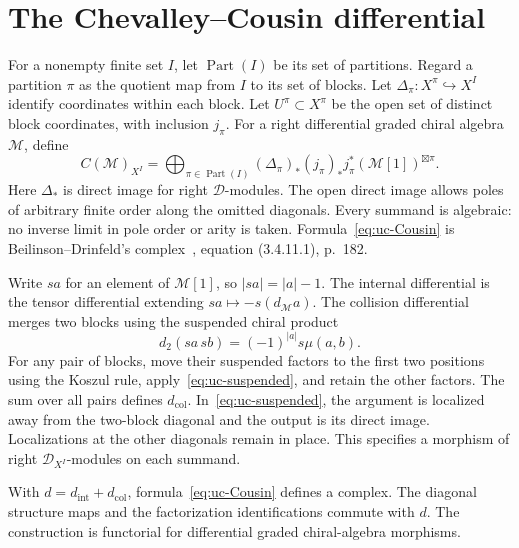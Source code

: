 \section{The Chevalley--Cousin differential}

For a nonempty finite set $I$, let $\operatorname{Part}(I)$ be its set of partitions.
Regard a partition $\pi$ as the quotient map from $I$ to its set of blocks.
Let $\Delta_\pi:X^\pi\hookrightarrow X^I$ identify coordinates within each block.
Let $U^\pi\subset X^\pi$ be the open set of distinct block coordinates, with inclusion $j_\pi$.
For a right differential graded chiral algebra $\mathcal M$, define
\begin{equation}\label{eq:uc-Cousin}
 C(\mathcal M)_{X^I}
 =\bigoplus_{\pi\in\operatorname{Part}(I)}
 (\Delta_\pi)_*(j_\pi)_*j_\pi^*
 (\mathcal M[1])^{\boxtimes\pi}.
\end{equation}
Here $\Delta_*$ is direct image for right $\mathcal D$-modules.
The open direct image allows poles of arbitrary finite order along the omitted diagonals.
Every summand is algebraic: no inverse limit in pole order or arity is taken.
Formula~\eqref{eq:uc-Cousin} is Beilinson--Drinfeld's complex~\cite{BD026}, equation (3.4.11.1), p.~182.

Write $sa$ for an element of $\mathcal M[1]$, so $|sa|=|a|-1$.
The internal differential is the tensor differential extending $sa\mapsto-s(d_\mathcal M a)$.
The collision differential merges two blocks using the suspended chiral product
\begin{equation}\label{eq:uc-suspended}
 d_2(sa\,sb)=(-1)^{|a|}s\mu(a,b).
\end{equation}
For any pair of blocks, move their suspended factors to the first two positions using the Koszul rule, apply~\eqref{eq:uc-suspended}, and retain the other factors.
The sum over all pairs defines $d_{\mathrm{col}}$.
In~\eqref{eq:uc-suspended}, the argument is localized away from the two-block diagonal and the output is its direct image.
Localizations at the other diagonals remain in place.
This specifies a morphism of right $\mathcal D_{X^I}$-modules on each summand.

\begin{proposition}\label{prop:uc-Ccomplex}
With $d=d_{\mathrm{int}}+d_{\mathrm{col}}$, formula~\eqref{eq:uc-Cousin} defines a complex.
The diagonal structure maps and the factorization identifications commute with $d$.
The construction is functorial for differential graded chiral-algebra morphisms.
\end{proposition}

